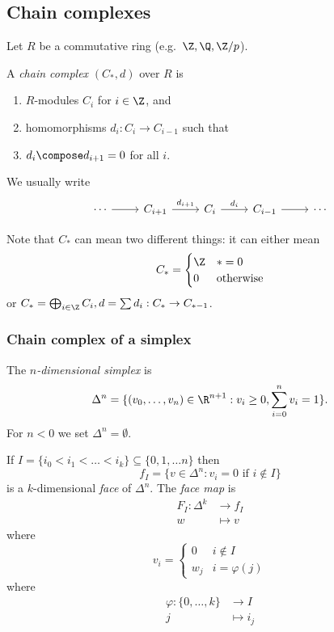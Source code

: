 \documentclass[a4paper]{article}
\begin{document}
\subsection{Chain complexes}

Let \(R\) be a commutative ring (e.g.\ \(\Z, \Q, \Z/p\)).

\begin{definition}
  A \emph{chain complex} \((C_*, d)\) over \(R\) is
  \begin{enumerate}
  \item \(R\)-modules \(C_i\) for \(i \in \Z\), and
  \item homomorphisms \(d_i: C_i \to C_{i - 1}\) such that
  \item \(d_i \compose d_{i + 1} = 0\) for all \(i\).
  \end{enumerate}
  We usually write
  \[
    \begin{tikzcd}
      \cdots \ar[r] & C_{i + 1} \ar[r, "d_{i + 1}"] & C_i \ar[r, "d_i"] & C_{i - 1} \ar[r] & \cdots
    \end{tikzcd}
  \]
\end{definition}

\begin{notation}
  Note that \(C_*\) can mean two different things: it can either mean
  \[
    C_* =
    \begin{cases}
      \Z & * = 0 \\
      0 & \text{otherwise}
    \end{cases}
  \]
  or \(C_* = \bigoplus_{i \in \Z} C_i, d = \sum d_i: C_* \to C_{* - 1}\).
\end{notation}

\subsubsection{Chain complex of a simplex}

\begin{definition}[simplex]
  The \emph{\(n\)-dimensional simplex} is
  \[
    \Delta^n = \{(v_0, \dots, v_n) \in \R^{n + 1}: v_i \geq 0, \sum_{i = 0}^n v_i = 1\}.
  \]
  For \(n < 0\) we set \(\Delta^n = \emptyset\).
\end{definition}

\begin{definition}[face]
  If \(I = \{i_0 < i_1 < \dots < i_k\} \subseteq \{0, 1, \dots n\}\) then
  \[
    f_I = \{v \in \Delta^n: v_i = 0 \text{ if } i \notin I\}
  \]
  is a \(k\)-dimensional \emph{face} of \(\Delta^n\). The \emph{face map} is
  \begin{align*}
    F_I: \Delta^k &\to f_I \\
    w &\mapsto v
  \end{align*}
  where
  \[
    v_i =
    \begin{cases}
      0 & i \notin I \\
      w_j & i = \varphi(j)
    \end{cases}
  \]
  where
  \begin{align*}
    \varphi: \{0, \dots, k\} &\to I \\
    j &\mapsto i_j
  \end{align*}
\end{definition}
\end{document}
